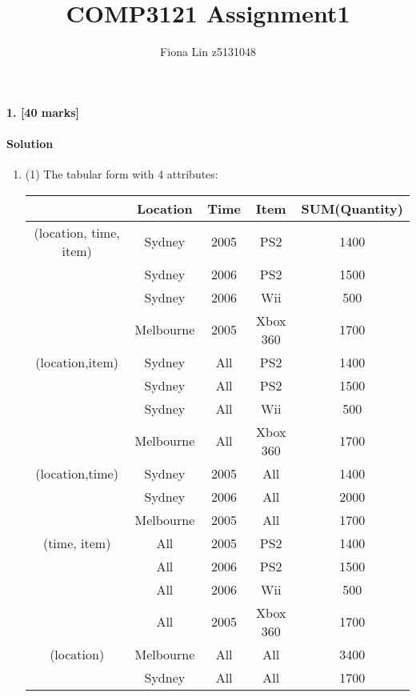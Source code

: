 \documentclass[a4paper]{scrartcl}
\title{COMP3121 Assignment1}
\author{Fiona Lin z5131048}
\begin{document}
\maketitle

\paragraph{1. [40 marks]}
\label{sec:Question 1}
\paragraph{Solution}
\begin{enumerate}[label=\arabic*)]
  \item  (1) The tabular form with 4 attributes:\\
  \begin{tabular}{c |c | c | c | c}
    \hline
    & Location & Time &  Item &  SUM(Quantity)  \\
    \hline
    (location, time, item) &    Sydney &    2005 &    PS2 &    1400\\
    \hline
    & Sydney    & 2006    & PS2    & 1500      \\
    \hline
    & Sydney  & 2006  & Wii  & 500 \\
    \hline
    & Melbourne  & 2005  & Xbox 360  & 1700 \\
    \hline
    (location,item) & Sydney  & All  & PS2  & 1400 \\
    \hline
    &  Sydney &  All &  PS2 &  1500\\
    \hline
    &  Sydney &  All &  Wii &  500\\
    \hline
    &  Melbourne &  All &  Xbox 360 &  1700\\
    \hline
    (location,time) &  Sydney &  2005 &  All &  1400\\
    \hline
    &  Sydney &  2006 &  All &  2000\\
    \hline
    &  Melbourne &  2005 &  All &  1700\\
    \hline
    (time, item) &  All &  2005 &  PS2 &  1400\\
    \hline
    &  All &  2006 &  PS2 &  1500\\
    \hline
    &  All &  2006 &  Wii &  500\\
    \hline
    &  All &  2005 &  Xbox 360 &  1700 \\
    \hline
    (location) &  Melbourne &  All &  All &  3400\\
    \hline
    &  Sydney &  All &  All &  1700 \\

\end{tabular}
\end{enumerate}
\end{document}

